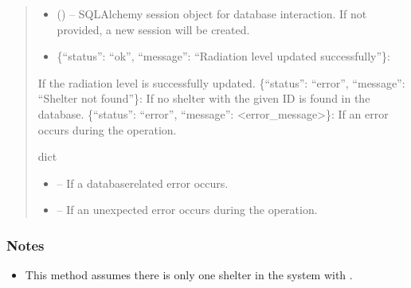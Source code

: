 \documentclass[letterpaper,10pt,english]{sphinxmanual}
\begin{document}
\begin{fulllineitems}
\begin{fulllineitems}
\begin{quote}
\begin{description}
\begin{itemize}
\item {} 
\sphinxAtStartPar
{} (\sphinxstyleliteralemphasis{\sphinxupquote{, }}) – SQLAlchemy session object for database interaction.
If not provided, a new session will be created.

\end{itemize}

\sphinxAtStartPar
\begin{description}
\begin{itemize}
\item {} 
\sphinxAtStartPar
\{“status”: “ok”, “message”: “Radiation level updated successfully”\}:

\end{itemize}

\sphinxAtStartPar
If the radiation level is successfully updated.
\sphinxhyphen{} \{“status”: “error”, “message”: “Shelter not found”\}:
If no shelter with the given ID is found in the database.
\sphinxhyphen{} \{“status”: “error”, “message”: <error\_message>\}:
If an error occurs during the operation.

\end{description}


\sphinxAtStartPar
dict

\begin{itemize}
\item {} 
\sphinxAtStartPar
{} – If a database\sphinxhyphen{}related error occurs.

\item {} 
\sphinxAtStartPar
{} – If an unexpected error occurs during the operation.

\end{itemize}

\end{description}\end{quote}
\subsubsection*{Notes}
\begin{itemize}
\item {} 
\sphinxAtStartPar
This method assumes there is only one shelter in the system with .


\end{itemize}
\end{fulllineitems}
\end{fulllineitems}
\end{document}
